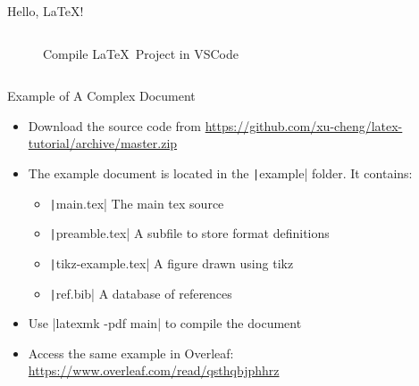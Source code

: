\begin{frame}[fragile]{Hello, \LaTeX!}
\begin{columns}
\begin{column}{.3\linewidth}
\begin{figure}
        \caption{Compile \LaTeX~Project in VSCode}
      \end{figure}
    \end{column}
  \end{columns}
\end{frame}

\begin{frame}[fragile]{Example of A Complex Document}
  \begin{itemize}
    \item Download the source code from \url{https://github.com/xu-cheng/latex-tutorial/archive/master.zip}
    \item The example document is located in the \texttt|example| folder. It contains:
          \begin{itemize}
            \item \texttt|main.tex| The main tex source
            \item \texttt|preamble.tex| A subfile to store format definitions
            \item \texttt|tikz-example.tex| A figure drawn using tikz
            \item \texttt|ref.bib| A database of references
          \end{itemize}
    \item Use \bashinline|latexmk -pdf main| to compile the document
    \item Access the same example in Overleaf: \url{https://www.overleaf.com/read/qsthqbjphhrz}
  \end{itemize}
\end{frame}

